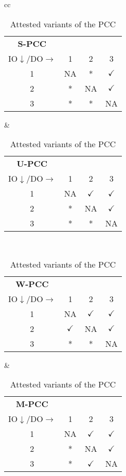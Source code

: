 \begin{exercise}
    \begin{table}[tbh]
    \centering
    \begin{tabular}{cc}
        \begin{tabular}{cccc}
            \textbf{S-PCC}\\
            IO$\downarrow$/DO$\rightarrow$ & 1 & 2 & 3\\\hline
            1 & NA & * & $\checkmark$ \\
            2 & * & NA & $\checkmark$ \\
            3 & * & * & NA\\
        \end{tabular}
        &
        \begin{tabular}{cccc}
            \textbf{U-PCC}\\
            IO$\downarrow$/DO$\rightarrow$ & 1 & 2 & 3\\\hline
            1 & NA & $\checkmark$ & $\checkmark$ \\
            2 & * & NA & $\checkmark$ \\
            3 & * & * & NA\\
        \end{tabular}
        \\[12pt]
        \begin{tabular}{cccc}
            \textbf{W-PCC}\\
            IO$\downarrow$/DO$\rightarrow$ & 1 & 2 & 3\\\hline
            1 & NA & $\checkmark$ & $\checkmark$ \\
            2 & $\checkmark$ & NA & $\checkmark$ \\
            3 & * & * & NA\\
        \end{tabular}
        &
        \begin{tabular}{cccc}
            \textbf{M-PCC}\\
            IO$\downarrow$/DO$\rightarrow$ & 1 & 2 & 3\\\hline
            1 & NA & $\checkmark$ & $\checkmark$ \\
            2 & * & NA & $\checkmark$ \\
            3 & * & $\checkmark$ & NA\\
        \end{tabular}
    \end{tabular}
    \caption{Attested variants of the PCC}
    \end{table}


\end{exercise}
